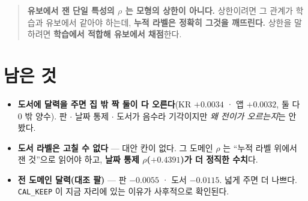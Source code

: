 \documentclass[11pt]{article}
\begin{document}
\begin{quote}
\textbf{유보에서 잰 단일 특성의 $\rho$ 는 모형의 상한이 아니다.} 상한이려면
그 관계가 학습과 유보에서 같아야 하는데, \textbf{누적 라벨은 정확히 그것을
깨뜨린다.} 상한을 말하려면 \textbf{학습에서 적합해 유보에서 채점}한다.
\end{quote}

\section*{남은 것}

\begin{itemize}
\item \textbf{도서에 달력을 주면 집 밖 짝 둘이 다 오른다}(KR $+0.0034$ ·
앱 $+0.0032$, 둘 다 $0$ 밖 양수). 판 $\cdot$ 날짜 통제 $\cdot$ 도서가 음수라
기각이지만 \emph{왜 전이가 오르는지}는 안 봤다.
\item \textbf{도서 라벨은 고칠 수 없다} --- 대안 칸이 없다. 그 도메인
$\rho$ 는 ``누적 라벨 위에서 잰 것''으로 읽어야 하고, \textbf{날짜 통제
$\rho$($+0.4391$)가 더 정직한 수치}다.
\item \textbf{전 도메인 달력(대조 팔)} --- 판 $-0.0055$ · 도서 $-0.0115$.
넓게 주면 더 나쁘다. \texttt{CAL\_KEEP} 이 지금 자리에 있는 이유가
사후적으로 확인된다.
\end{itemize}
\end{document}
